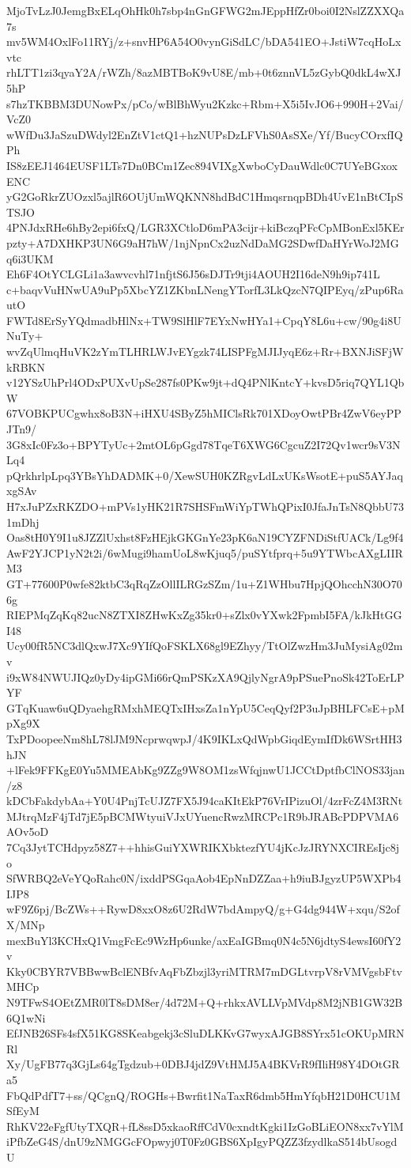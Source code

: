 MjoTvLzJ0JemgBxELqOhHk0h7sbp4nGnGFWG2mJEppHfZr0boi0I2NslZZXXQa7s
mv5WM4OxlFo11RYj/z+snvHP6A54O0vynGiSdLC/bDA541EO+JstiW7cqHoLxvtc
rhLTT1zi3qyaY2A/rWZh/8azMBTBoK9vU8E/mb+0t6znnVL5zGybQ0dkL4wXJ5hP
s7hzTKBBM3DUNowPx/pCo/wBlBhWyu2Kzkc+Rbm+X5i5IvJO6+990H+2Vai/VcZ0
wWfDu3JaSzuDWdyl2EnZtV1ctQ1+hzNUPsDzLFVhS0AsSXe/Yf/BucyCOrxfIQPh
IS8zEEJ1464EUSF1LTs7Dn0BCm1Zec894VIXgXwboCyDauWdlc0C7UYeBGxoxENC
yG2GoRkrZUOzxl5ajlR6OUjUmWQKNN8hdBdC1HmqsrnqpBDh4UvE1nBtCIpSTSJO
4PNJdxRHe6hBy2epi6fxQ/LGR3XCtloD6mPA3cijr+kiBczqPFcCpMBonExl5KEr
pzty+A7DXHKP3UN6G9aH7hW/1njNpnCx2uzNdDaMG2SDwfDaHYrWoJ2MGq6i3UKM
Eh6F4OtYCLGLi1a3awvcvhl71nfjtS6J56sDJTr9tji4AOUH2I16deN9h9ip741L
c+baqvVuHNwUA9uPp5XbcYZ1ZKbnLNengYTorfL3LkQzcN7QIPEyq/zPup6RautO
FWTd8ErSyYQdmadbHlNx+TW9SlHlF7EYxNwHYa1+CpqY8L6u+cw/90g4i8UNuTy+
wvZqUlmqHuVK2zYmTLHRLWJvEYgzk74LISPFgMJIJyqE6z+Rr+BXNJiSFjWkRBKN
v12YSzUhPrl4ODxPUXvUpSe287fs0PKw9jt+dQ4PNlKntcY+kvsD5riq7QYL1QbW
67VOBKPUCgwhx8oB3N+iHXU4SByZ5hMIClsRk701XDoyOwtPBr4ZwV6eyPPJTn9/
3G8xIc0Fz3o+BPYTyUc+2mtOL6pGgd78TqeT6XWG6CgcuZ2I72Qv1wcr9sV3NLq4
pQrkhrlpLpq3YBsYhDADMK+0/XewSUH0KZRgvLdLxUKsWsotE+puS5AYJaqxgSAv
H7xJuPZxRKZDO+mPVs1yHK21R7SHSFmWiYpTWhQPixI0JfaJnTsN8QbbU731mDhj
Oas8tH0Y9I1u8JZZlUxhst8FzHEjkGKGnYe23pK6aN19CYZFNDiStfUACk/Lg9f4
AwF2YJCP1yN2t2i/6wMugi9hamUoL8wKjuq5/puSYtfprq+5u9YTWbcAXgLIIRM3
GT+77600P0wfe82ktbC3qRqZzOllILRGzSZm/1u+Z1WHbu7HpjQOhcchN30O706g
RIEPMqZqKq82ucN8ZTXI8ZHwKxZg35kr0+sZlx0vYXwk2FpmbI5FA/kJkHtGGI48
Ucy00fR5NC3dlQxwJ7Xc9YIfQoFSKLX68gl9EZhyy/TtOlZwzHm3JuMysiAg02mv
i9xW84NWUJIQz0yDy4ipGMi66rQmPSKzXA9QjlyNgrA9pPSuePnoSk42ToErLPYF
GTqKuaw6uQDyaehgRMxhMEQTxIHxsZa1nYpU5CeqQyf2P3uJpBHLFCsE+pMpXg9X
TxPDoopeeNm8hL78lJM9NcprwqwpJ/4K9IKLxQdWpbGiqdEymIfDk6WSrtHH3hJN
+lFek9FFKgE0Yu5MMEAbKg9ZZg9W8OM1zsWfqjnwU1JCCtDptfbClNOS33jan/z8
kDCbFakdybAa+Y0U4PnjTcUJZ7FX5J94caKItEkP76VrIPizuOl/4zrFcZ4M3RNt
MJtrqMzF4jTd7jE5pBCMWtyuiVJxUYuencRwzMRCPc1R9bJRABcPDPVMA6AOv5oD
7Cq3JytTCHdpyz58Z7++hhisGuiYXWRIKXbktezfYU4jKcJzJRYNXCIREsIjc8jo
SfWRBQ2eVeYQoRahc0N/ixddPSGqaAob4EpNnDZZaa+h9iuBJgyzUP5WXPb4IJP8
wF9Z6pj/BcZWs++RywD8xxO8z6U2RdW7bdAmpyQ/g+G4dg944W+xqu/S2ofX/MNp
mexBuYl3KCHxQ1VmgFcEc9WzHp6unke/axEaIGBmq0N4c5N6jdtyS4ewsI60fY2v
Kky0CBYR7VBBwwBclENBfvAqFbZbzjl3yriMTRM7mDGLtvrpV8rVMVgsbFtvMHCp
N9TFwS4OEtZMR0lT8sDM8er/4d72M+Q+rhkxAVLLVpMVdp8M2jNB1GW32B6Q1wNi
EfJNB26SFs4sfX51KG8SKeabgekj3cSluDLKKvG7wyxAJGB8SYrx51cOKUpMRNRl
Xy/UgFB77q3GjLs64gTgdzub+0DBJ4jdZ9VtHMJ5A4BKVrR9fIliH98Y4DOtGRa5
FbQdPdfT7+ss/QCgnQ/ROGHs+Bwrfit1NaTaxR6dmb5HmYfqbH21D0HCU1MSfEyM
RhKV22eFgfUtyTXQR+fL8ssD5xkaoRffCdV0cxndtKgki1IzGoBLiEON8xx7vYlM
iPfbZeG4S/dnU9zNMGGcFOpwyj0T0Fz0GBS6XpIgyPQZZ3fzydlkaS514bUsogdU
